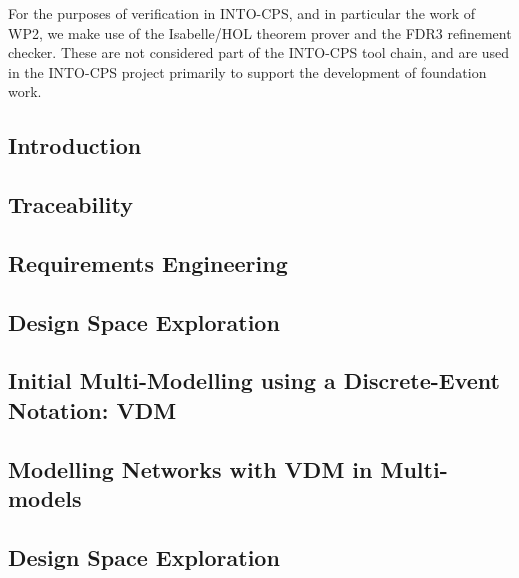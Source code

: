 For the purposes of verification in INTO-CPS, and in particular the work of WP2, we make use of the Isabelle/HOL theorem prover and the FDR3 refinement checker. These are not considered part of the INTO-CPS tool chain, and are used in the INTO-CPS project primarily to support the development of foundation work.

\subsection{Introduction}
\label{sec:method:workflows}

\subsection{Traceability}
\label{sec:method:trace}

\subsection{Requirements Engineering}
\label{sec:method:reqeng}

\subsection{Design Space Exploration}
\label{sec:method:sysml}

\subsection{Initial Multi-Modelling using a Discrete-Event Notation: VDM}
\label{sec:method:defirst}

\subsection{Modelling Networks with VDM in Multi-models}
\label{sec:method:networks}

\subsection{Design Space Exploration}
\label{sec:method:dse}


